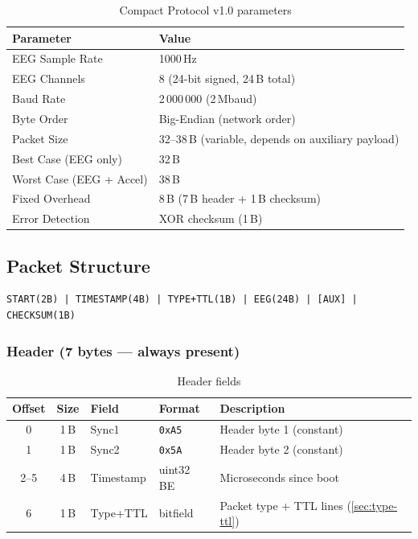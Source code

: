 \documentclass[11pt,a4paper]{article}
\newcommand{\hex}[1]{\texttt{0x#1}}
\begin{document}
\iffalse

\begin{table}[H]
\centering
\caption{Compact Protocol v1.0 parameters}
\label{tab:proto-params}
\begin{tabularx}{\textwidth}{l X}
\toprule
\textbf{Parameter} & \textbf{Value} \\
\midrule
EEG Sample Rate      & 1000\,Hz \\
EEG Channels         & 8 (24-bit signed, 24\,B total) \\
Baud Rate            & 2\,000\,000 (2\,Mbaud) \\
Byte Order           & Big-Endian (network order) \\
Packet Size          & 32--38\,B (variable, depends on auxiliary payload) \\
Best Case (EEG only) & 32\,B \\
Worst Case (EEG + Accel) & 38\,B \\
Fixed Overhead       & 8\,B (7\,B header + 1\,B checksum) \\
Error Detection      & XOR checksum (1\,B) \\
\bottomrule
\end{tabularx}
\end{table}

\subsection{Packet Structure}

\begin{lstlisting}
START(2B) | TIMESTAMP(4B) | TYPE+TTL(1B) | EEG(24B) | [AUX] | CHECKSUM(1B)
\end{lstlisting}

\subsubsection{Header (7 bytes — always present)}

\begin{table}[H]
\centering
\caption{Header fields}
\label{tab:header-fields}
\begin{tabularx}{\textwidth}{c c l l X}
\toprule
\textbf{Offset} & \textbf{Size} & \textbf{Field} & \textbf{Format} & \textbf{Description} \\
\midrule
0   & 1\,B & Sync1     & \hex{A5}      & Header byte 1 (constant) \\
1   & 1\,B & Sync2     & \hex{5A}      & Header byte 2 (constant) \\
2--5 & 4\,B & Timestamp & uint32 BE     & Microseconds since boot \\
6   & 1\,B & Type+TTL  & bitfield      & Packet type + TTL lines (\cref{sec:type-ttl}) \\
\bottomrule
\end{tabularx}
\end{table}
\end{document}
